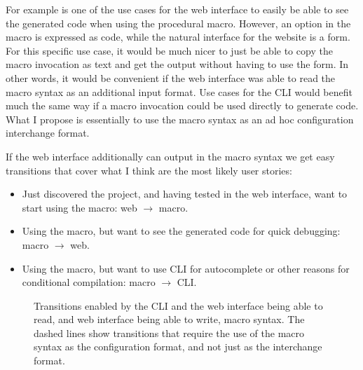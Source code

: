 For example is one of the use cases for the web interface to easily be able to see the generated code when using the procedural macro. However, an option in the macro is expressed as code, while the natural interface for the website is a form. For this specific use case, it would be much nicer to just be able to copy the macro invocation as text and get the output without having to use the form. In other words, it would be convenient if the web interface was able to read the macro syntax as an additional input format. Use cases for the CLI would benefit much the same way if a macro invocation could be used directly to generate code. What I propose is essentially to use the macro syntax as an ad hoc configuration interchange format.

If the web interface additionally can output in the macro syntax we get easy transitions that cover what I think are the most likely user stories:

\begin{itemize}
  \item Just discovered the project, and having tested in the web interface, want to start using the macro: web $\rightarrow$ macro.
  \item Using the macro, but want to see the generated code for quick debugging: macro $\rightarrow$ web.
  \item Using the macro, but want to use CLI for autocomplete or other reasons for conditional compilation: macro $\rightarrow$ CLI.
\end{itemize}

\begin{figure}[ht!]
\vspace{2mm}
\centering
{}
\vspace{2mm}
\caption{Transitions enabled by the CLI and the web interface being able to read, and web interface being able to write, macro syntax. The dashed lines show transitions that require the use of the macro syntax as the configuration format, and not just as the interchange format.}
\label{fig:transitions}
\end{figure}

